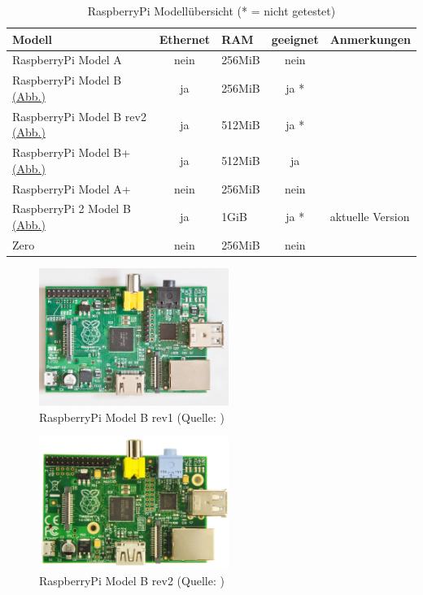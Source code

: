 \begin{table}[h!]
  \center
  \begin{tabular}{ l | c | l || c | l }
    \hline
    Modell & Ethernet & RAM & geeignet & Anmerkungen\\ \hline
    RaspberryPi Model A & nein & 256MiB & nein \\
    RaspberryPi Model B {\hyperref[fig:rpib1]{(Abb.)}} & ja & 256MiB & ja * \\
    RaspberryPi Model B rev2 {\hyperref[fig:rpib2]{(Abb.)}} & ja & 512MiB & ja * \\
    RaspberryPi Model B+ {\hyperref[fig:rpibplus]{(Abb.)}} & ja & 512MiB & ja \\
    RaspberryPi Model A+ & nein & 256MiB & nein \\
    RaspberryPi 2 Model B {\hyperref[fig:rpi2b]{(Abb.)}} & ja & 1GiB & ja * & aktuelle Version \\
    Zero & nein & 256MiB & nein \\
    \hline
  \end{tabular}
	\caption{RaspberryPi Modellübersicht (* = nicht getestet)}
	\label{tab:rpimodels}
\end{table}

\clearpage

\begin{figure}[h!]
	\centering
		\includegraphics[width=0.55\textwidth]{./fotos/Raspberry_Pi_B_rev_1.jpg}
	\caption{RaspberryPi Model B rev1 (Quelle: \cite{rpib1})}
	\label{fig:rpib1}
\end{figure}

\begin{figure}[h!]
	\centering
		\includegraphics[width=0.55\textwidth]{./fotos/Raspberry_Pi_B_rev_2.jpg}
	\caption{RaspberryPi Model B rev2 (Quelle: \cite{rpib2})}
	\label{fig:rpib2}
\end{figure}

